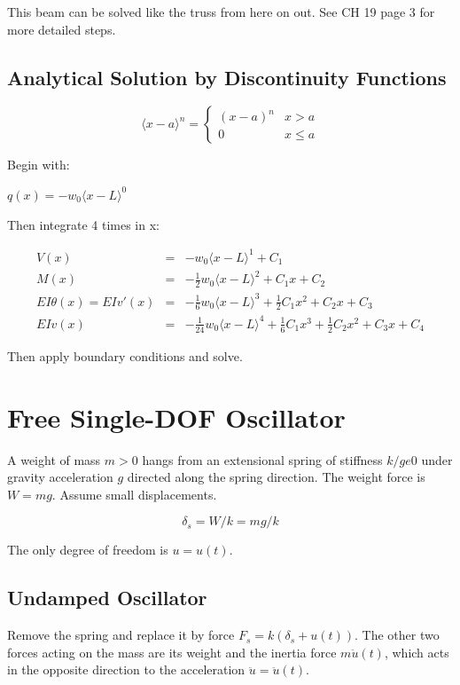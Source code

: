 \documentclass{article}
\begin{document}
\begin{multicols*}{2}
    This beam can be solved like the truss from here on out. See CH 19 page 3 
    for more detailed steps.

    \subsection*{Analytical Solution by Discontinuity Functions}
    \begin{equation*}
        \langle x-a \rangle ^n = \begin{cases} 
            (x-a)^n  & x>a\\
            0 &  x \le a
        \end{cases}
    \end{equation*}

    Begin with:\par 
    $q(x)=-w_0\langle x-L \rangle ^0$\par 
    Then integrate 4 times in x:\par 
    \begin{equation*}
        \begin{array}{llll}
            V(x) & = & -w_0\langle x-L \rangle ^1 + C_1\\
            M(x) & = & -\frac{1}{2}w_0\langle x-L\rangle ^2 + C_1x+C_2\\
            EI\theta (x) = EIv'(x) & = & -\frac{1}{6}w_0\langle x-L\rangle^3+\frac{1}{2}C_1x^2+C_2x+C_3\\
            EIv(x) & = & -\frac{1}{24}w_0\langle x-L\rangle^4 + \frac{1}{6}C_1x^3+\frac{1}{2}C_2x^2+C_3x+C_4
        \end{array}
    \end{equation*}

    Then apply boundary conditions and solve.

    \section*{Free Single-DOF Oscillator}
    A weight of mass $m > 0$ hangs from an extensional spring of stiffness $k /ge 0$
    under gravity acceleration $g$ directed along the spring direction. The weight
    force is $W = mg$. Assume small displacements.

    $$\delta_s=W/k=mg/k$$

    The only degree of freedom is $u = u(t)$.

    \subsection*{Undamped Oscillator}
    Remove the spring and replace it by force $F_s = k(\delta_s+u(t))$. The other
    two forces acting on the mass are its weight and the inertia force $m\ddot{u}(t)$,
    which acts in the opposite direction to the acceleration $\ddot{u}=\ddot{u}(t)$.


\end{multicols*}
\end{document}
